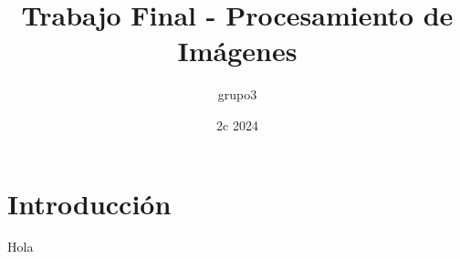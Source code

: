 \documentclass{article}
\title{Trabajo Final - Procesamiento de Imágenes}
\author{grupo3}
\date{2c 2024}
\begin{document}
\maketitle

\section{Introducción}
\par Hola
\end{document}
